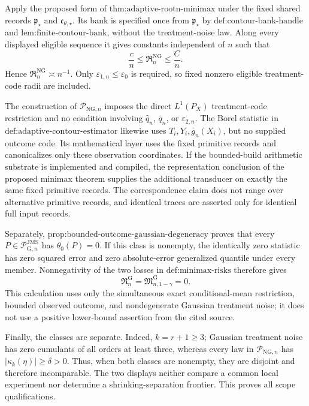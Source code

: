 Apply the proposed form of \(\text{thm:adaptive-rootn-minimax}\) under the fixed shared records \(\mathfrak p_{\star}\) and \(\mathfrak c_{\theta,\star}\).  Its bank is specified once from \(\mathfrak p_{\star}\) by \(\text{def:contour-bank-handle}\) and \(\text{lem:finite-contour-bank}\), without the treatment-noise law.  Along every displayed eligible sequence it gives constants independent of \(n\) such that
\[
 \frac cn\le\mathfrak R_n^{\mathrm{NG}}\le\frac Cn.
\]
Hence \(\mathfrak R_n^{\mathrm{NG}}\asymp n^{-1}\).  Only \(\varepsilon_{1,n}\le\varepsilon_0\) is required, so fixed nonzero eligible treatment-code radii are included.

The construction of \(\mathcal P_{\mathrm{NG},n}\) imposes the direct \(L^1(P_X)\) treatment-code restriction and no condition involving \(\widehat q_n\), \(\bar q_n\), or \(\varepsilon_{2,n}\).  The Borel statistic in \(\text{def:adaptive-contour-estimator}\) likewise uses \(T_i,Y_i,\bar g_n(X_i)\), but no supplied outcome code.  Its mathematical layer uses the fixed primitive records and canonicalizes only these observation coordinates.  If the bounded-build arithmetic substrate is implemented and compiled, the representation conclusion of the proposed minimax theorem supplies the additional transducer on exactly the same fixed primitive records.  The correspondence claim does not range over alternative primitive records, and identical traces are asserted only for identical full input records.

Separately, \(\text{prop:bounded-outcome-gaussian-degeneracy}\) proves that every \(P\in\mathcal P_{\mathrm G,n}^{\mathrm{JMS}}\) has \(\theta_0(P)=0\).  If this class is nonempty, the identically zero statistic has zero squared error and zero absolute-error generalized quantile under every member.  Nonnegativity of the two losses in \(\text{def:minimax-risks}\) therefore gives
\[
 \mathfrak R_n^{\mathrm G}
 =\mathfrak M_{n,1-\gamma}^{\mathrm G}=0.
\]
This calculation uses only the simultaneous exact conditional-mean restriction, bounded observed outcome, and nondegenerate Gaussian treatment noise; it does not use a positive lower-bound assertion from the cited source.

Finally, the classes are separate.  Indeed, \(k=r+1\ge3\); Gaussian treatment noise has zero cumulants of all orders at least three, whereas every law in \(\mathcal P_{\mathrm{NG},n}\) has \(|\kappa_k(\eta)|\ge\delta>0\).  Thus, when both classes are nonempty, they are disjoint and therefore incomparable.  The two displays neither compare a common local experiment nor determine a shrinking-separation frontier.  This proves all scope qualifications.